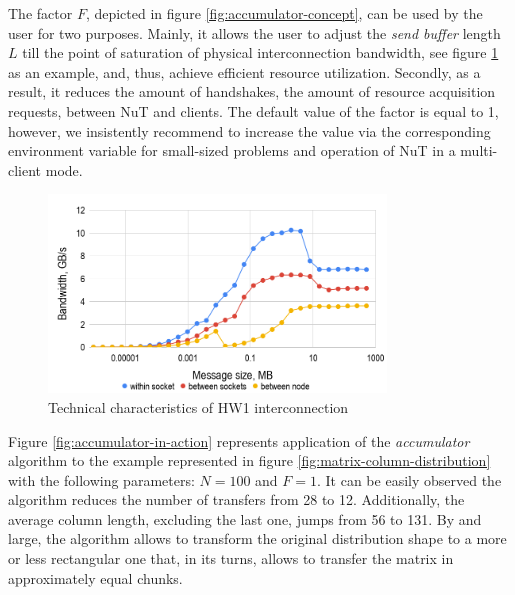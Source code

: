 The factor $F$, depicted in figure \ref{fig:accumulator-concept}, can be used by the user for two purposes. Mainly, it allows the user to adjust the \textit{send buffer} length $L$ till the point of saturation of physical interconnection bandwidth, see figure \ref{fig:hw1-bandwidth} as an example, and, thus, achieve efficient resource utilization. Secondly, as a result, it reduces the amount of handshakes, the amount of resource acquisition requests, between NuT and clients. The default value of the factor is equal to 1, however, we insistently recommend to increase the value via the corresponding environment variable for small-sized problems and operation of NuT in a multi-client mode.\\


\begin{figure}[htpb]
  \centering
  \includegraphics[width=0.8\textwidth]{figures/chapter-3/hw1-bandwidth.png}
  \caption{Technical characteristics of HW1 interconnection} \label{fig:hw1-bandwidth}
\end{figure}



Figure \ref{fig:accumulator-in-action} represents application of the \textit{accumulator} algorithm to the example represented in figure \ref{fig:matrix-column-distribution} with the following parameters: $N = 100$ and $F = 1$. It can be easily observed the algorithm reduces the number of transfers from 28 to 12. Additionally, the average column length, excluding the last one, jumps from 56 to 131. By and large, the algorithm allows to transform the original distribution shape to a more or less rectangular one that, in its turns, allows to transfer the matrix in approximately equal chunks.\\



